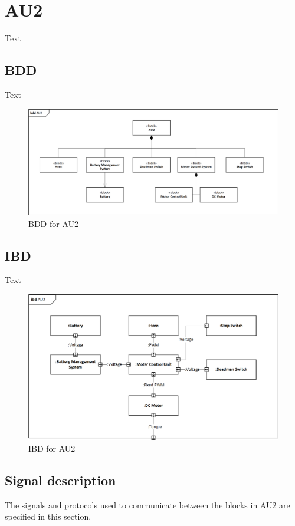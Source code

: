 \section{AU2}
Text

\subsection{BDD}
Text

\begin{figure}[H]
	\centering
	\includegraphics[width=0.9\linewidth]{Architecture/BDD_AU2}
	\caption{ BDD for AU2}
	\label{fig:AU2_BDD}
\end{figure}

\subsection{IBD}
Text

\begin{figure}[H]
	\centering
	\includegraphics[width=0.9\linewidth]{Architecture/IBD_AU2}
	\caption{IBD for AU2}
	\label{fig:AU2_IBD}
\end{figure}

\subsection{Signal description}
The signals and protocols used to communicate between the blocks in AU2 are specified in this section.

